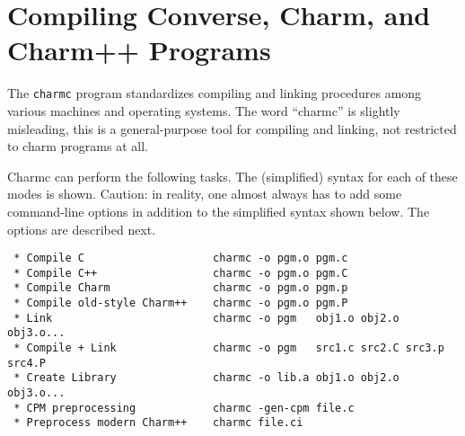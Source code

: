 %
%
%
%
%
%
%
%
%
%
%

\section{Compiling Converse, Charm, and Charm++ Programs}

The {\tt charmc} program standardizes compiling and linking procedures
among various machines and operating systems.  The word ``charmc'' is
slightly misleading, this is a general-purpose tool for compiling and
linking, not restricted to charm programs at all.

Charmc can perform the following tasks.  The (simplified) syntax for
each of these modes is shown.  Caution: in reality, one almost always
has to add some command-line options in addition to the simplified
syntax shown below.  The options are described next.

\begin{verbatim}
 * Compile C                    charmc -o pgm.o pgm.c
 * Compile C++                  charmc -o pgm.o pgm.C
 * Compile Charm                charmc -o pgm.o pgm.p
 * Compile old-style Charm++    charmc -o pgm.o pgm.P
 * Link                         charmc -o pgm   obj1.o obj2.o obj3.o...
 * Compile + Link               charmc -o pgm   src1.c src2.C src3.p src4.P
 * Create Library               charmc -o lib.a obj1.o obj2.o obj3.o...
 * CPM preprocessing            charmc -gen-cpm file.c
 * Preprocess modern Charm++    charmc file.ci
\end{verbatim}

